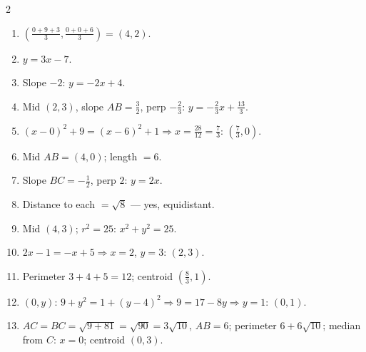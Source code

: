 \documentclass[11pt]{article}
\begin{document}
\begin{keybox}
\begin{multicols}{2}
\small
\begin{enumerate}[leftmargin=*,itemsep=3pt]
  \item $\left(\tfrac{0+9+3}{3},\tfrac{0+0+6}{3}\right)=(4,2)$.
  \item $y=3x-7$.
  \item Slope $-2$: $y=-2x+4$.
  \item Mid $(2,3)$, slope $AB=\tfrac32$, perp $-\tfrac23$: $y=-\tfrac23x+\tfrac{13}{3}$.
  \item $(x-0)^2+9=(x-6)^2+1\Rightarrow x=\tfrac{28}{12}=\tfrac73$: $\left(\tfrac73,0\right)$.
  \item Mid $AB=(4,0)$; length $=6$.
  \item Slope $BC=-\tfrac12$, perp $2$: $y=2x$.
  \item Distance to each $=\sqrt8$ --- yes, equidistant.
  \item Mid $(4,3)$; $r^2=25$: $x^2+y^2=25$.
  \item $2x-1=-x+5\Rightarrow x=2$, $y=3$: $(2,3)$.
  \item Perimeter $3+4+5=12$; centroid $\left(\tfrac83,1\right)$.
  \item $(0,y)$: $9+y^2=1+(y-4)^2\Rightarrow 9=17-8y\Rightarrow y=1$: $(0,1)$.
  \item $AC=BC=\sqrt{9+81}=\sqrt{90}=3\sqrt{10}$, $AB=6$; perimeter $6+6\sqrt{10}$; median from $C$: $x=0$; centroid $(0,3)$.
\end{enumerate}
\end{multicols}
\end{keybox}
\end{document}
